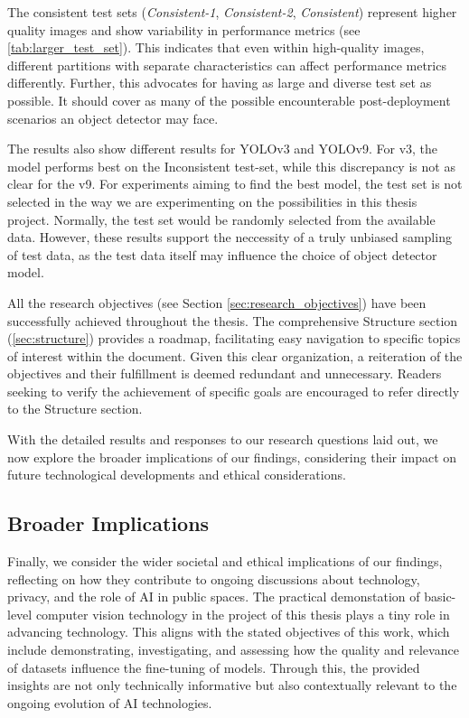 \begin{enumerate}
    The consistent test sets (\textit{Consistent-1}, \textit{Consistent-2}, \textit{Consistent}) represent higher quality images and show variability in performance metrics (see \ref{tab:larger_test_set}). This indicates that even within high-quality images, different partitions with separate characteristics can affect performance metrics differently. Further, this advocates for having as large and diverse test set as possible. It should cover as many of the possible encounterable post-deployment scenarios an object detector may face. 

    The results also show different results for YOLOv3 and YOLOv9. For v3, the model performs best on the Inconsistent test-set, while this discrepancy is not as clear for the v9. For experiments aiming to find the best model, the test set is not selected in the way we are experimenting on the possibilities in this thesis project. Normally, the test set would be randomly selected from the available data. However, these results support the neccessity of a truly unbiased sampling of test data, as the test data itself may influence the choice of object detector model. 
\end{enumerate}

All the research objectives (see Section \ref{sec:research_objectives}) have been successfully achieved throughout the thesis. The comprehensive Structure section (\ref{sec:structure}) provides a roadmap, facilitating easy navigation to specific topics of interest within the document. Given this clear organization, a reiteration of the objectives and their fulfillment is deemed redundant and unnecessary. Readers seeking to verify the achievement of specific goals are encouraged to refer directly to the Structure section.

With the detailed results and responses to our research questions laid out, we now explore the broader implications of our findings, considering their impact on future technological developments and ethical considerations.

\newpage
\subsection{Broader Implications}
\label{sec:discussion_broader_context}
Finally, we consider the wider societal and ethical implications of our findings, reflecting on how they contribute to ongoing discussions about technology, privacy, and the role of AI in public spaces. The practical demonstation of basic-level computer vision technology in the project of this thesis plays a tiny role in advancing technology. This aligns with the stated objectives of this work, which include demonstrating, investigating, and assessing how the quality and relevance of datasets influence the fine-tuning of models. Through this, the provided insights are not only technically informative but also contextually relevant to the ongoing evolution of AI technologies.

